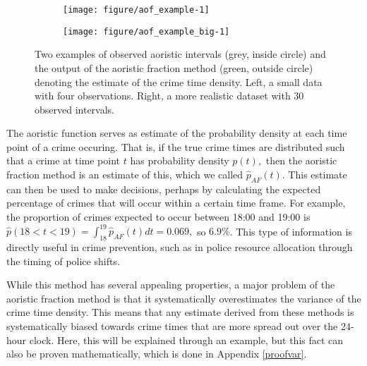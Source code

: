 \begin{figure}
\centering
\begin{subfigure}[b]{0.5\linewidth}
\centering
\begin{knitrout}
\color{fgcolor}
\texttt{[image: figure/aof\_example-1]} 

\end{knitrout}
\caption{} \label{aof_small}
\end{subfigure}%
\begin{subfigure}[b]{0.5\linewidth}
\centering
\begin{knitrout}
\color{fgcolor}
\texttt{[image: figure/aof\_example\_big-1]} 

\end{knitrout}
\caption{} \label{aof_big}
\end{subfigure}%
\caption{Two examples of observed aoristic intervals (grey, inside circle) and the output of the aoristic fraction method (green, outside circle) denoting the estimate of the crime time density. Left, a small data with four observations. Right, a more realistic dataset with 30 observed intervals.} \label{aof_ex}
\end{figure}

The aoristic function serves as estimate of the probability density at each time point of a crime occuring. That is, if the true crime times are distributed such that a crime at time point $t$ has probability density $p(t),$ then the aoristic fraction method is an estimate of this, which we called $\hat{p}_{AF}(t).$ This estimate can then be used to make decisions, perhaps by calculating the expected percentage of crimes that will occur within a certain time frame. For example, the proportion of crimes expected to occur between 18:00 and 19:00 is $\hat{p}(18 < t < 19) = \int_{18}^{19} \hat{p}_{AF}(t) dt = 0.069,$ so $6.9\%$. This type of information is directly useful in crime prevention, such as in police resource allocation through the timing of police shifts.

While this method has several appealing properties, a major problem of the aoristic fraction method is that it systematically overestimates the variance of the crime time density. This means that any estimate derived from these methods is systematically biased towards crime times that are more spread out over the 24-hour clock. Here, this will be explained through an example, but this fact can also be proven mathematically, which is done in Appendix \ref{proofvar}.

